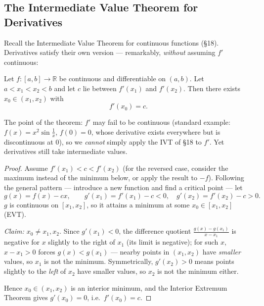 \documentclass[11pt]{report}
\begin{document}
\subsection{The Intermediate Value Theorem for Derivatives}

Recall the Intermediate Value Theorem for continuous functions (\S 18). Derivatives satisfy their own version --- remarkably, \emph{without} assuming $f'$ continuous:

\begin{thmbox}
Let $f: [a,b] \to \mathbb{R}$ be continuous and differentiable on $(a,b)$. Let $a < x_1 < x_2 < b$ and let $c$ lie between $f'(x_1)$ and $f'(x_2)$. Then there exists $x_0 \in (x_1, x_2)$ with
\[
f'(x_0) = c.
\]
\end{thmbox}

\begin{rembox}
The point of the theorem: $f'$ may fail to be continuous (standard example: $f(x) = x^2 \sin\tfrac1x$, $f(0)=0$, whose derivative exists everywhere but is discontinuous at $0$), so we \emph{cannot} simply apply the IVT of \S 18 to $f'$. Yet derivatives still take intermediate values.
\end{rembox}

\begin{proof}
Assume $f'(x_1) < c < f'(x_2)$ (for the reversed case, consider the maximum instead of the minimum below, or apply the result to $-f$). Following the general pattern --- introduce a new function and find a critical point --- let
\[
g(x) = f(x) - cx, \qquad g'(x_1) = f'(x_1) - c < 0, \quad g'(x_2) = f'(x_2) - c > 0.
\]
$g$ is continuous on $[x_1, x_2]$, so it attains a minimum at some $x_0 \in [x_1, x_2]$ (EVT).

\emph{Claim: $x_0 \neq x_1, x_2$.} Since $g'(x_1) < 0$, the difference quotient $\tfrac{g(x) - g(x_1)}{x - x_1}$ is negative for $x$ slightly to the right of $x_1$ (its limit is negative); for such $x$, $x - x_1 > 0$ forces $g(x) < g(x_1)$ --- nearby points in $(x_1, x_2)$ have \emph{smaller} values, so $x_1$ is not the minimum. Symmetrically, $g'(x_2) > 0$ means points slightly to the \emph{left} of $x_2$ have smaller values, so $x_2$ is not the minimum either.

Hence $x_0 \in (x_1, x_2)$ is an interior minimum, and the Interior Extremum Theorem gives $g'(x_0) = 0$, i.e.\ $f'(x_0) = c$.
\end{proof}
\end{document}
